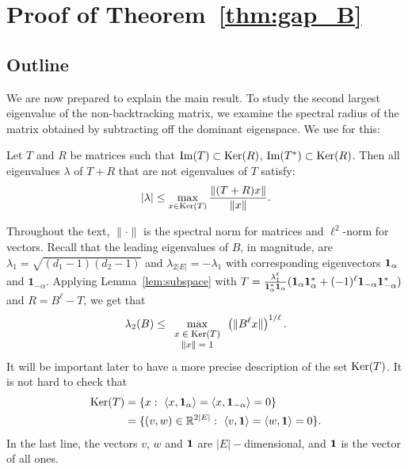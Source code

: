 \section{Proof of Theorem~\ref{thm:gap_B}}

\subsection{Outline}
\label{sec:proof_outline}

We are now prepared to explain the main result.
To study the second largest eigenvalue of the non-backtracking matrix,
we examine the spectral radius of the matrix obtained by subtracting
off the dominant eigenspace.
 We use for this:
\begin{lemma}
\label{lem:subspace}
Let $T$ and $R$ be matrices such that $\mathrm{Im}(T)\subset \mathrm{Ker}(R)$, 
$\mathrm{Im}(T^*)\subset \mathrm{Ker}(R)$. 
Then all eigenvalues $\lambda$ of $T+R$
that are not eigenvalues of $T$ satisfy:
\[
|\lambda|\leq \max_{x\in \mathrm{Ker}(T)}\frac{\|(T+R)x\|}{\|x\|} .
\]
\end{lemma}
Throughout the text,
$\| \cdot \|$ is the spectral norm for matrices and $\ell^2$-norm for vectors.
Recall that the leading eigenvalues of $B$, in magnitude, are 
$\lambda_1 = \sqrt{(d_1 -1)(d_2-1)}$ and $\lambda_{2|E|} = -\lambda_1$
with corresponding eigenvectors $\mathbf{1}_{\alpha}$ and $\mathbf{1}_{-\alpha}$.
Applying Lemma~\ref{lem:subspace} with 
$T 
= 
\frac{\lambda_1^{\ell}}{\mathbf{1}_{\alpha}^* \mathbf{1}_{\alpha}}
(\mathbf{1}_{\alpha} \mathbf{1}_{\alpha}^* +
(-1)^\ell \mathbf{1}_{-\alpha} \mathbf{1}_{-\alpha}^*)$
and 
$R = B^\ell - T$,
we get that
\begin{align}
\label{eq:upper_bound_lambda2}
\lambda_2(B)
\leq 
\max_{
\footnotesize
\begin{array}{c}
x \in \mathrm{Ker}(T) \\ 
\|x\| = 1 
\end{array}
} 
\left( \| B^{\ell}x \| \right)^{1/\ell}.
\end{align}
It will be important later to have a more precise description of the set $\mathrm{Ker}(T)$. 
It is not hard to check that 
\begin{align*}
\mathrm{Ker}(T) &= \{x:
  ~ \langle x, \mathbf{1}_{\alpha} \rangle = \langle x, \mathbf{1}_{-\alpha} \rangle=0\} \\
& =\{(v,w)\in \mathbb{R}^{2|E|}: 
  ~ \langle v, \mathbf{1} \rangle = \langle w, \mathbf{1} \rangle=0\}.
\end{align*}
In the last line, the vectors $v$, $w$ and $\mathbf{1}$ are $|E|-$dimensional, 
and $\mathbf{1}$ is the vector of all ones.

